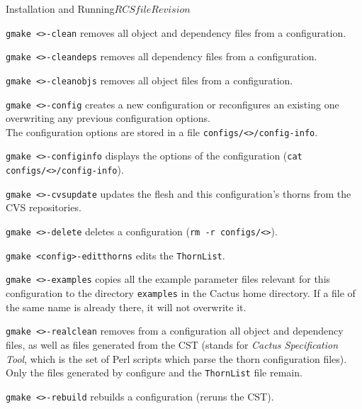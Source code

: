 \begin{cactuspart}{Installation and Running}{$RCSfile$}{$Revision$}
\begin{Lentry}
\item [\texttt{gmake <\var{config}>-clean}] removes all object and dependency
files from a configuration.

\item [\texttt{gmake <\var{config}>-cleandeps}] removes all dependency files
from a configuration.

\item [\texttt{gmake <\var{config}>-cleanobjs}] removes all object files from
  a configuration.

\item [\texttt{gmake <\var{config}>-config}] creates a new configuration or
reconfigures an existing one overwriting any previous configuration options.\\
The configuration options are stored in a file
\texttt{configs/<>/config-info}.

\item [\texttt{gmake <\var{config}>-configinfo}] displays the options
of the configuration (\texttt{cat configs/<>/config-info}).

\item[\texttt{gmake <\var{config}>-cvsupdate}] updates the flesh and this
configuration's thorns from the CVS repositories.

\item [\texttt{gmake <\var{config}>-delete}] deletes a configuration
(\texttt{rm -r configs/<>}).

\item [\texttt{gmake <config>-editthorns}] edits the \texttt{ThornList}.

\item [\texttt{gmake <\var{config}>-examples}] copies all the example parameter files relevant for this configuration to the directory \texttt{examples} in the Cactus home directory. If a file of the same name is already there, it will not overwrite it.

\item [\texttt{gmake <\var{config}>-realclean}] removes from a configuration
all object and dependency files, as well as files generated from the
CST (stands for \textit{Cactus Specification Tool}, which is the set of Perl scripts
which parse the thorn configuration files).  Only the files generated
by configure and the \texttt{ThornList} file remain.

\item [\texttt{gmake <\var{config}>-rebuild}] rebuilds a configuration (reruns the CST).


\end{Lentry}
\end{cactuspart}
